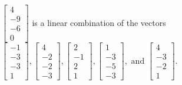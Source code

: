\begin{exercise}
\begin{exerciseStatement}
  \end{exerciseStatement}
  \begin{exerciseAnswer}
   \(\left[\begin{array}{c}
4 \\
-9 \\
-6 \\
0
\end{array}\right]\) 
  	 is  
	a linear combination of the vectors \(\left[\begin{array}{c}
-1 \\
-3 \\
-3 \\
1
\end{array}\right] , \left[\begin{array}{c}
4 \\
-2 \\
-2 \\
-3
\end{array}\right] , \left[\begin{array}{c}
2 \\
-1 \\
2 \\
1
\end{array}\right] , \left[\begin{array}{c}
1 \\
-3 \\
-5 \\
-3
\end{array}\right] , \text{ and } \left[\begin{array}{c}
4 \\
-3 \\
-2 \\
1
\end{array}\right]\).

	
  


  \end{exerciseAnswer}
\end{exercise}